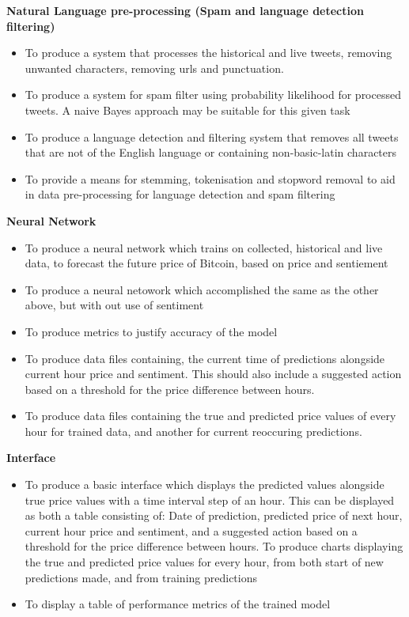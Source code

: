\documentclass[oneside, 12pt]{article}
\begin{document}
	
		\textbf{Natural Language pre-processing (Spam and language detection filtering)}
		\begin{itemize}
			\item To produce a system that processes the historical and live tweets, removing unwanted characters, removing urls and punctuation.
			\item To produce a system for spam filter using probability likelihood for processed tweets. A naive Bayes approach may be suitable for this given task
			\item To produce a language detection and filtering system that removes all tweets that are not of the English language or containing non-basic-latin characters
			\item To provide a means for stemming, tokenisation and stopword removal to aid in data pre-processing for language detection and spam filtering
			\newline
		\end{itemize}
		
		\textbf{Neural Network}
		\begin{itemize}
			\item To produce a neural network which trains on collected, historical and live data, to forecast the future price of Bitcoin, based on price and sentiement
			\item To produce a neural netowork which accomplished the same as the other above, but with out use of sentiment
			\item To produce metrics to justify accuracy of the model
			\item To produce data files containing, the current time of predictions alongside current hour price and sentiment. This should also include a suggested action based on a threshold for the price difference between hours. 
			\item To produce data files containing the true and predicted price values of every hour for trained data, and another for current reoccuring predictions.
			\newline
		\end{itemize}
		
		\textbf{Interface}
		\begin{itemize}
			\item To produce a basic interface which displays the predicted values alongside true price values with a time interval step of an hour. This can be displayed as both a table consisting of: 
			\subitem Date of prediction, predicted price of next hour, current hour price and sentiment, and a suggested action based on a threshold for the price difference between hours.
			\subitem To produce charts displaying the true and predicted price values for every hour, from both start of new predictions made, and from training predictions
			\item To display a table of performance metrics of the trained model
			\newline
		\end{itemize}
	
\end{document}
